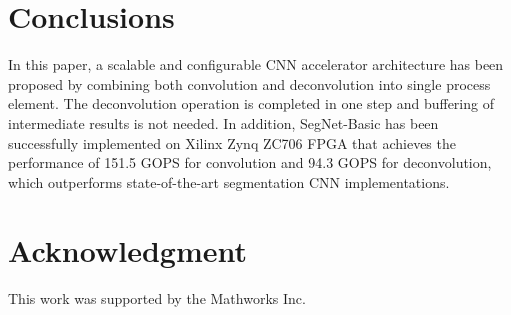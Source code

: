\documentclass[conference]{IEEEtran}
\begin{document}
\section{Conclusions}\label{sec:Conclusions}
In this paper, a scalable and configurable CNN accelerator architecture has been proposed by combining both convolution and deconvolution into single process element. The deconvolution operation is completed in one step and buffering of intermediate results is not needed. In addition, SegNet-Basic has been successfully implemented on Xilinx Zynq ZC706 FPGA that achieves the performance of 151.5 GOPS for convolution and 94.3 GOPS for deconvolution, which outperforms state-of-the-art segmentation CNN implementations.

\section*{Acknowledgment}
This work was supported by the Mathworks Inc.
\end{document}
